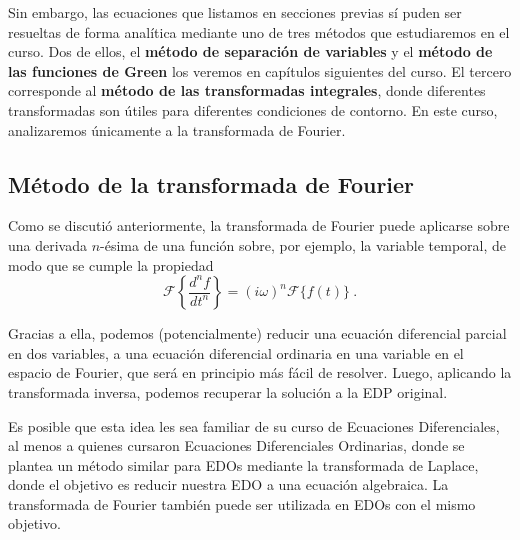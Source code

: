 Sin embargo, las ecuaciones que listamos en secciones previas sí puden ser resueltas de forma analítica mediante uno de tres métodos que estudiaremos en el curso. Dos de ellos, el \textbf{método de separación de variables} y el \textbf{método de las funciones de Green} los veremos en capítulos siguientes del curso. El tercero corresponde al \textbf{método de las transformadas integrales}, donde diferentes transformadas son útiles para diferentes condiciones de contorno. En este curso, analizaremos únicamente a la transformada de Fourier.

\subsection{Método de la transformada de Fourier}

Como se discutió anteriormente, la transformada de Fourier puede aplicarse sobre una derivada $n$-ésima de una función sobre, por ejemplo, la variable temporal, de modo que se cumple la propiedad
\begin{equation}
\mathcal{F}\left\{ \frac{d^n f}{dt^n} \right\} = (i\omega)^n \mathcal{F}\{f(t)\} \ .
\end{equation}

Gracias a ella, podemos (potencialmente) reducir una ecuación diferencial parcial en dos variables, a una ecuación diferencial ordinaria en una variable en el espacio de Fourier, que será en principio más fácil de resolver. Luego, aplicando la transformada inversa, podemos recuperar la solución a la EDP original.

Es posible que esta idea les sea familiar de su curso de Ecuaciones Diferenciales, al menos a quienes cursaron Ecuaciones Diferenciales Ordinarias, donde se plantea un método similar para EDOs mediante la transformada de Laplace, donde el objetivo es reducir nuestra EDO a una ecuación algebraica. La transformada de Fourier también puede ser utilizada en EDOs con el mismo objetivo.

